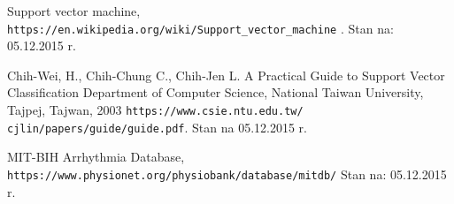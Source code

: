 \begin{thebibliography}{99}
Support vector machine,
\newblock \texttt{https://en.wikipedia.org/wiki/Support\_vector\_machine} .
\newblock Stan na: 05.12.2015 r.

Chih-Wei, H., Chih-Chung C., Chih-Jen L.
\newblock A Practical Guide to Support Vector Classification
\newblock Department of Computer Science, National Taiwan University, Tajpej, Tajwan, 2003
\newblock \texttt{https://www.csie.ntu.edu.tw/~ cjlin/papers/guide/guide.pdf}.
\newblock Stan na 05.12.2015 r.

MIT-BIH Arrhythmia Database,
\newblock \texttt{https://www.physionet.org/physiobank/database/mitdb/}
\newblock Stan na: 05.12.2015 r.


\end{thebibliography}